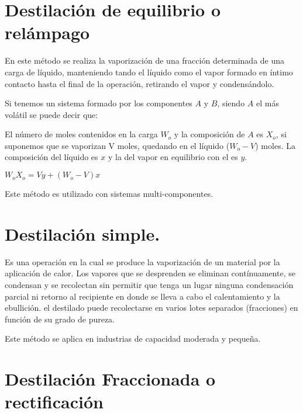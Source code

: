 \documentclass[11pt,openany]{book}
\begin{document}

\section {Destilación de equilibrio o relámpago}

En este método se realiza la vaporización de una fracción determinada de una carga de líquido,
manteniendo tando el líquido como el vapor formado en íntimo contacto hasta el final de la 
operación, retirando el vapor y condensándolo.

Si tenemos un sistema formado por los componentes $A$ y $B$, siendo $A$ el más volátil se puede decir que:

El número de moles contenidos en la carga $W_o$ y la composición de $A$ es $X_o$, si suponemos que se 
vaporizan V moles, quedando en el líquido ($W_o - V$) moles. La composición del líquido es $x$ y la del 
vapor en equilibrio con el es $y$.

$W_o X_o = V y +(W_o -V) x$


Este método es utilizado con sistemas multi-componentes.

\section {Destilación simple.}

Es una operación en la cual se produce la vaporización de un material por la aplicación de calor. Los 
vapores que se desprenden se eliminan contínuamente, se condensan y se recolectan sin permitir 
que tenga un lugar ninguna condensación parcial ni retorno al recipiente en donde se lleva a cabo 
el calentamiento y la ebullición. el destilado puede recolectarse en varios lotes separados
 (fracciones) en función de su grado de pureza.

 Este método se aplica en industrias de capacidad moderada y pequeña.

 \section{Destilación Fraccionada o rectificación}
\end{document}
